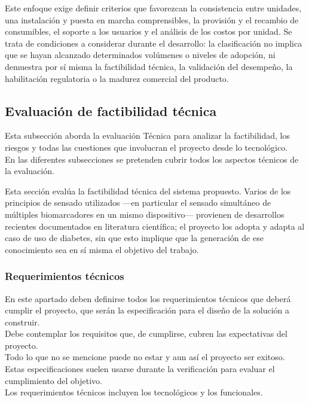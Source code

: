 Este enfoque exige definir criterios que favorezcan la consistencia entre unidades, una instalación y puesta en marcha comprensibles, la provisión y el recambio de consumibles, el soporte a los usuarios y el análisis de los costos por unidad. Se trata de condiciones a considerar durante el desarrollo: la clasificación no implica que se hayan alcanzado determinados volúmenes o niveles de adopción, ni demuestra por sí misma la factibilidad técnica, la validación del desempeño, la habilitación regulatoria o la madurez comercial del producto.


\subsection{Evaluación de factibilidad técnica}
{\consigna
Esta subsección aborda la evaluación Técnica para analizar la factibilidad, los riesgos y todas las cuestiones que involucran el proyecto desde lo tecnológico.\\
En las diferentes subsecciones se pretenden cubrir todos los aspectos técnicos de la evaluación.
}

Esta sección evalúa la factibilidad técnica del sistema propuesto. Varios de los principios de sensado utilizados —en particular el sensado simultáneo de múltiples biomarcadores en un mismo dispositivo— provienen de desarrollos recientes documentados en literatura científica; el proyecto los adopta y adapta al caso de uso de diabetes, sin que esto implique que la generación de ese conocimiento sea en sí misma el objetivo del trabajo.

\subsubsection{Requerimientos técnicos}
{\consigna
En este apartado deben definirse todos los requerimientos técnicos que deberá cumplir el proyecto, que serán la especificación para el diseño de la solución a construir.\\
Debe contemplar los requisitos que, de cumplirse, cubren las expectativas del proyecto.\\
Todo lo que no se mencione puede no estar y aun así el proyecto ser exitoso.\\
Estas especificaciones suelen usarse durante la verificación para evaluar el cumplimiento del objetivo.\\
Los requerimientos técnicos incluyen los tecnológicos y los funcionales.
}


